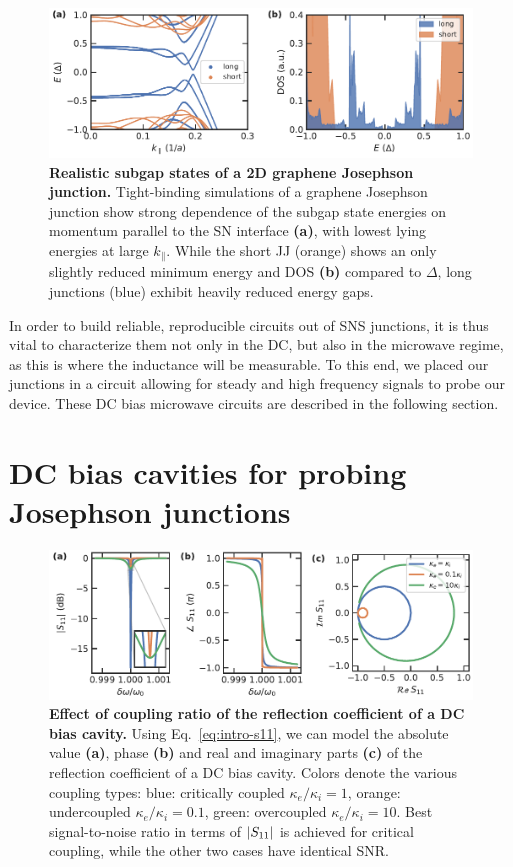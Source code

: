 \begin{figure}[t]
	\centering
	\includegraphics[width=\linewidth]{chapter-introduction/figs/kwant_modeling_181206_subgap_length_supp_Plot_subgap_dos}
	\caption{
		\textbf{Realistic subgap states of a 2D graphene Josephson junction.}
		Tight-binding simulations of a graphene Josephson junction show strong dependence of the subgap state energies on momentum parallel to the SN interface \textbf{(a)}, with lowest lying energies at large $k_\parallel$.
		While the short JJ (orange) shows an only slightly reduced minimum energy and DOS \textbf{(b)} compared to $\Delta$, long junctions (blue) exhibit heavily reduced energy gaps.
	}
	\label{fig:modelsubgap}
\end{figure}

In order to build reliable, reproducible circuits out of SNS junctions, it is thus vital to characterize them not only in the DC, but also in the microwave regime, as this is where the inductance will be measurable.
%
To this end, we placed our junctions in a circuit allowing for steady and high frequency signals to probe our device.
%
These DC bias microwave circuits are described in the following section.

\section{DC bias cavities for probing Josephson junctions}

\begin{figure}[t]
	\centering
	\includegraphics[width=\linewidth]{chapter-introduction/figs/model_DC_bias_cavity_coupling.pdf}
	\caption{
		\textbf{Effect of coupling ratio of the reflection coefficient of a DC bias cavity.}
		Using Eq.~\ref{eq:intro-s11}, we can model the absolute value \textbf{(a)}, phase \textbf{(b)} and real and imaginary parts \textbf{(c)} of the reflection coefficient of a DC bias cavity.
		Colors denote the various coupling types: blue: critically coupled $\kappa_e/\kappa_i=1$, orange: undercoupled $\kappa_e/\kappa_i=0.1$, green: overcoupled $\kappa_e/\kappa_i=10$.
		Best signal-to-noise ratio in terms of $\lvert S_{11}\rvert$ is achieved for critical coupling, while the other two cases have identical SNR.
	}
	\label{fig:s11}
\end{figure}


